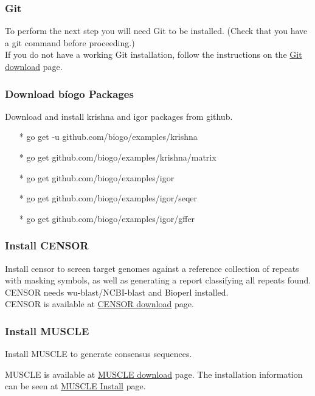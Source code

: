 \documentclass[12pt]{report}
\begin{document}
\subsubsection{Git}
To perform the next step you will need Git to be installed. (Check that you have a git command before proceeding.) \\

\noindent If you do not have a working Git installation, follow the instructions on the \href{https://git-scm.com/downloads}{\color{blue}Git download} page.

\subsubsection{Download b\'iogo Packages}
Download and install krishna and igor packages from github. \\

\begin{enumerate}
	\item[*] go get -u github.com/biogo/examples/krishna
	\item[*] go get github.com/biogo/examples/krishna/matrix
	\item[*] go get github.com/biogo/examples/igor
	\item[*] go get github.com/biogo/examples/igor/seqer
	\item[*] go get github.com/biogo/examples/igor/gffer
\end{enumerate}

\subsubsection{ Install CENSOR}
Install censor to screen target genomes against a reference collection of repeats with masking symbols, as well as generating a report classifying all repeats found. CENSOR needs wu-blast/NCBI-blast and Bioperl installed.\\

\noindent CENSOR is available at \href{http://www.girinst.org/downloads/software/censor/} {\color{blue}CENSOR download} page.

\subsubsection{ Install MUSCLE}
Install MUSCLE to generate consensus sequences.

\noindent MUSCLE is available at \href{https://www.drive5.com/muscle/downloads.htm} {\color{blue}MUSCLE download} page.
\noindent The installation information can be seen at \href{https://www.drive5.com/muscle/manual/install.html} {\color{blue}MUSCLE Install} page.
\end{document}
